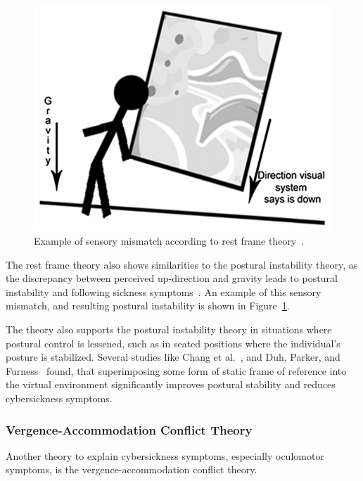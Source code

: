 \begin{figure}[h]
    \centering
    \includegraphics[width=\textwidth/2]{content/2_2_cybersickness/img/SensoryMismatchRestFrame[Rebenitsch2016]}
    \caption{Example of sensory mismatch according to rest frame theory~\cite{Rebenitsch2016}.}
    \label{fig:sensory-mismatch-example}
\end{figure}

The rest frame theory also shows similarities to the postural instability theory, as the discrepancy between perceived
up-direction and gravity leads to postural instability and following sickness symptoms~\cite{Rebenitsch2016}.
An example of this sensory mismatch, and resulting postural instability is shown in
Figure~\ref{fig:sensory-mismatch-example}.

The theory also supports the postural instability theory in situations where postural control is lessened, such as in
seated positions where the individual's posture is stabilized.
Several studies like Chang et al.~\cite{Chang2013}, and Duh, Parker, and Furness~\cite{Duh2001b} found, that
superimposing some form of static frame of reference into the virtual environment significantly improves postural
stability and reduces cybersickness symptoms.


\subsubsection{Vergence-Accommodation Conflict Theory}\label{subsubsec:vergence-accommodation-conflict-theory}

Another theory to explain cybersickness symptoms, especially oculomotor symptoms, is the \mbox{vergence-accommodation}
conflict theory.

